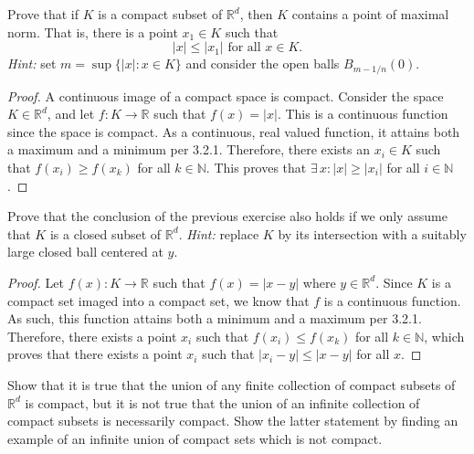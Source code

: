 \documentclass[12pt]{book}
\newcommand{\N}{\mathbb{N}}
\newcommand{\R}{\mathbb{R}}
\newenvironment{exercise}[2][Exercise]{\begin{trivlist}
\item[\hskip \labelsep {\bfseries #1}\hskip \labelsep {\bfseries #2.}]}{\end{trivlist}}
\begin{document}
\begin{exercise}{7.2.7}
\begin{exercise}{7.4.4}
Prove that if $K$ is a compact subset of $\R^d$, then $K$ contains a point of maximal norm. That is, there is a point $x_1 \in K$ such that
    \[ |x| \leq |x_1| \text{ for all } x \in K. \]
\emph{Hint:} set $m =\sup\{ |x| : x \in K \}$  and consider the open balls $B_{m-1/n}(0)$.

    \begin{proof}
    A continuous image of a compact space is compact. Consider the space $K \in \R^d$, and let $f:K \to \R$ such that $f(x)=|x|$. This is a continuous function since the space is compact. As a continuous, real valued function, it attains both a maximum and a minimum per 3.2.1. Therefore, there exists an $x_i \in K$ such that $f(x_i) \geq f(x_k)$ for all $k \in \N$. This proves that $\exists \,x : |x| \geq |x_i|$ for all $i \in \N$.
    \end{proof}
\end{exercise}




\begin{exercise}{7.4.6}
Prove that the conclusion of the previous exercise also holds if we only assume that $K$ is a closed subset of $\R^d$. \emph{Hint:} replace $K$ by its intersection with a suitably large closed ball centered at $y$.

    \begin{proof}
    Let $f(x): K \to \R$ such that $f(x) = |x-y|$ where $y \in \R^d$. Since $K$ is a compact set imaged into a compact set, we know that $f$ is a continuous function. As such, this function attains both a minimum and a maximum per 3.2.1. Therefore, there exists a point $x_i$ such that $f(x_i) \leq f(x_k)$ for all $k \in \N$, which proves that there exists a point $x_i$ such that $\left| x_i - y \right| \leq \left| x- y \right| $ for all $x$.
    \end{proof}
\end{exercise}




\begin{exercise}{7.4.9}
Show that it is true that the union of any finite collection of compact
subsets of $\R^d$ is compact, but it is not true that the union of an infinite
collection of compact subsets is necessarily compact. Show the latter
statement by finding an example of an infinite union of compact sets which
is not compact. \\


\end{exercise}
\end{exercise}
\end{document}
